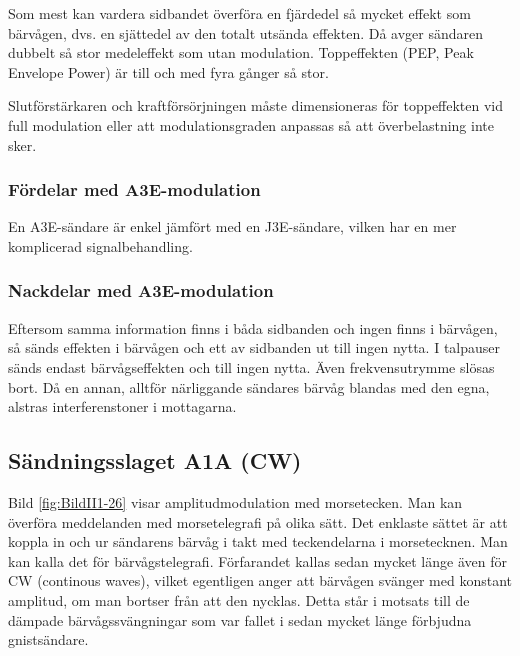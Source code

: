 Som mest kan vardera sidbandet överföra en fjärdedel så mycket effekt som
bärvågen, dvs. en sjättedel av den totalt utsända effekten.
Då avger sändaren dubbelt så stor medeleffekt som utan modulation.
Toppeffekten (PEP, Peak Envelope Power) är till och med fyra gånger så stor.

Slutförstärkaren och kraftförsörjningen måste dimensioneras för toppeffekten vid
full modulation eller att modulationsgraden anpassas så att överbelastning inte
sker.

\subsubsection{Fördelar med A3E-modulation}

En A3E-sändare är enkel jämfört med en J3E-sändare, vilken har en mer
komplicerad signalbehandling.

\subsubsection{Nackdelar med A3E-modulation}

Eftersom samma information finns i båda sidbanden och ingen finns i bärvågen,
så sänds effekten i bärvågen och ett av sidbanden ut till ingen nytta.
I talpauser sänds endast bärvågseffekten och till ingen nytta.
Även frekvensutrymme slösas bort.
Då en annan, alltför närliggande sändares bärvåg blandas med den egna,
alstras interferenstoner i mottagarna.

\subsection{Sändningsslaget A1A (CW)}
\label{modulation_cw}


Bild \ref{fig:BildII1-26} visar amplitudmodulation med morsetecken.
Man kan överföra meddelanden med morsetelegrafi på olika sätt.
Det enklaste sättet är att koppla in och ur sändarens bärvåg i takt med
teckendelarna i morsetecknen.
Man kan kalla det för bärvågstelegrafi.
Förfarandet kallas sedan mycket länge även för CW (continous waves), vilket
egentligen anger att bärvågen svänger med konstant amplitud, om man bortser
från att den nycklas.
Detta står i motsats till de dämpade bärvågssvängningar som var fallet i sedan
mycket länge förbjudna gnistsändare.

